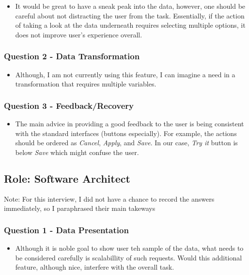 \documentclass[12pt,letterpaper]{article}
\begin{document}
\begin{itemize}
    \item It would be great to have a sneak peak into the data, however, one should be careful about not distracting the user from the task. Essentially, if the action of taking a look at the data underneath requires selecting multiple options, it does not improve user's experience overall. 
\end{itemize}

\subsubsection*{Question 2 - Data Transformation}
\begin{itemize}
    \item Although, I am not currently using this feature, I can imagine a need in a transformation that requires multiple variables.
\end{itemize}

\subsubsection*{Question 3 - Feedback/Recovery}
\begin{itemize}
    \item The main advice in providing a good feedback to the user is being consistent with the standard interfaces (buttons especially). For example, the actions should be ordered as \textit{Cancel}, \textit{Apply}, and \textit{Save}. In our case, \textit{Try it} button is below \textit{Save} which might confuse the user.
\end{itemize}

\subsection*{Role: Software Architect}

Note: For this interview, I did not have a chance to record the answers immediately, so I paraphrased their main takeways
\subsubsection*{Question 1 - Data Presentation}

\begin{itemize}
    \item Although it is noble goal to show user teh sample of the data, what needs to be considered carefully is scalabillity of such requests. Would this additional feature, although nice, interfere with the overall task.  
\end{itemize}
\end{document}
